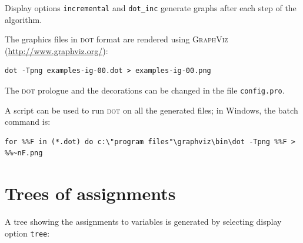 \documentclass[11pt]{article}
\newcommand*{\p}[1]{\textup{\texttt{#1}}}
\newcommand*{\dt}{\textsc{dot}}
\begin{document}
Display options \p{incremental} and \p{dot\_inc} generate graphs after
each step of the algorithm.

The graphics files in \dt{} format are rendered using
\textsc{GraphViz} (\url{http://www.graphviz.org/}):

\begin{verbatim}
dot -Tpng examples-ig-00.dot > examples-ig-00.png
\end{verbatim}

The \dt{} prologue and the decorations can be changed in the file
\p{config.pro}. 

A script can be used to run \dt{} on all the generated files; in
Windows, the batch command is:

\begin{verbatim}
for %%F in (*.dot) do c:\"program files"\graphviz\bin\dot -Tpng %%F > %%~nF.png
\end{verbatim}

\newpage

\section{Trees of assignments}

A tree showing the assignments to variables is generated by selecting
display option \p{tree}:
\end{document}
